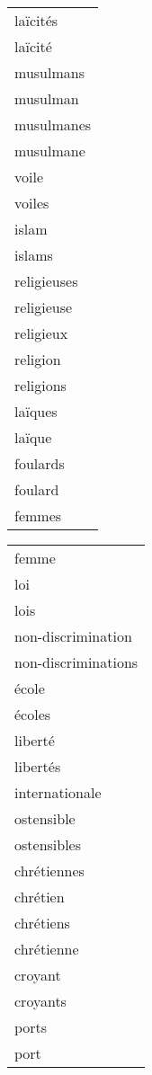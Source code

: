 \begin{table}[h]
\vspace{0.2cm}
	\begin{center}
\sffamily
\fontsize{9}{10}
\selectfont{}
	\begin{tabular}{|l|}

\hline
laïcités\\
laïcité\\
musulmans\\
musulman\\
musulmanes\\
musulmane\\
voile\\
voiles\\
islam\\
islams\\
religieuses\\
religieuse\\
religieux\\
religion\\
religions\\
laïques\\
laïque\\
foulards\\
foulard\\
femmes\\
\hline
	\end{tabular}
	\begin{tabular}{|l|}
\hline
femme\\
loi\\
lois\\
non-discrimination\\
non-discriminations\\
école\\
écoles\\
liberté\\
libertés\\
internationale\\
ostensible\\
ostensibles\\
chrétiennes\\
chrétien\\
chrétiens\\
chrétienne\\
croyant\\
croyants\\
ports\\
port\\
\hline
	\end{tabular}
	\begin{tabular}{|l|}

\end{tabular}
\end{center}
\end{table}
